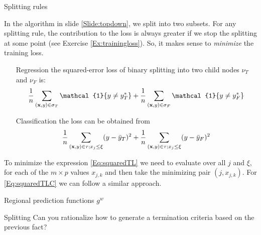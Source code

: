 \documentclass{beamer}
\begin{document}
\begin{frame}{Splitting rules}
    
    In the algorithm in slide \ref{Slide:topdown}, we split into two subsets. For any splitting rule, the contribution to the loss is always greater if we stop the splitting at some point (see Exercise \ref{Ex:trainingloss}). So, it makes sense to {\em minimize} the training loss. 
    \begin{enumerate}
        \item[Regression] the squared-error loss of binary splitting into two child nodes $\nu_T$ and $\nu_F$  is:
        \begin{equation}
            \frac{1}{n}\sum_{(\uvec{x},y)\in\sigma_T}\mathcal{1}\{y\neq y_T^*\}+\frac{1}{n}\sum_{(\uvec{x},y)\in\sigma_F}\mathcal{1}\{y\neq y_F^*\}
            \label{Eq:squaredTLR}
        \end{equation}
        \item[Classification] the loss can be obtained from
        \begin{equation}
            \frac{1}{n}\sum_{(\textbf{x},y)\in\tau;x_j\leq \xi}(y-\bar{y}_T)^2+\frac{1}{n}\sum_{(\textbf{x},y)\in\tau;x_j\leq \xi}(y-\bar{y}_F)^2
            \label{Eq:squaredTLC}
        \end{equation}
    \end{enumerate}

    To minimize the expression \ref{Eq:squaredTL} we need to evaluate over all $j$ and $\xi$, for each of the $m\times p$ values $x_{j,k}$ and then take the minimizing pair $(j,x_{j,k})$. For \ref{Eq:squaredTLC} we can follow a similar approach.
\end{frame}

\begin{frame}{Regional prediction functions $g^{w}$}
    
    \begin{Exercise}{Splitting}
        Can you rationalize how to generate a termination criteria based on the previous fact?
    \end{Exercise}
\end{frame}
\end{document}
